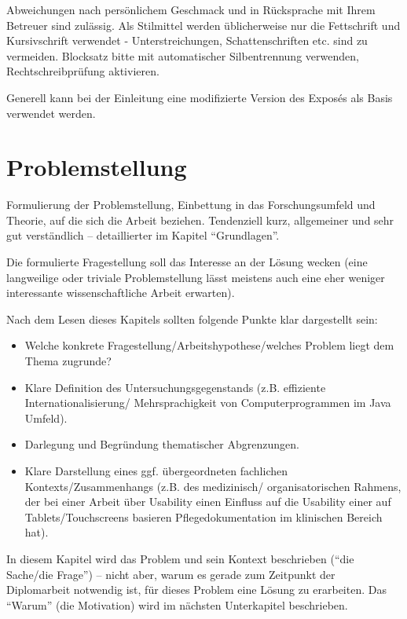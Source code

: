 Abweichungen nach persönlichem Geschmack und in Rücksprache mit Ihrem Betreuer sind zulässig. Als Stilmittel werden üblicherweise nur die Fettschrift und Kursivschrift verwendet - Unterstreichungen, Schattenschriften etc. sind zu vermeiden. Blocksatz bitte mit automatischer Silbentrennung verwenden, Rechtschreibprüfung aktivieren.

Generell kann bei der Einleitung eine modifizierte Version des Exposés als Basis verwendet werden.

\section{Problemstellung}

Formulierung der Problemstellung, Einbettung in das Forschungsumfeld und Theorie, auf die sich die Arbeit beziehen. Tendenziell kurz, allgemeiner und sehr gut verständlich -- detaillierter im Kapitel \enquote{Grundlagen}.

Die formulierte Fragestellung soll das Interesse an der Lösung wecken (eine langweilige oder triviale Problemstellung lässt meistens auch eine eher weniger interessante wissenschaftliche Arbeit erwarten).

\makeatletter\ifthesis@masterthesis
Nach dem Lesen dieses Kapitels sollten folgende Punkte klar dargestellt sein:
\begin{itemize}
	\item Welche konkrete Fragestellung/Arbeitshypothese/welches Problem liegt dem Thema zugrunde?
	\item Klare Definition des Untersuchungsgegenstands (z.B. effiziente Internationalisierung/ Mehrsprachigkeit von Computerprogrammen im Java Umfeld).
	\item Darlegung und Begründung thematischer Abgrenzungen.
	\item Klare Darstellung eines ggf. übergeordneten fachlichen Kontexts/Zusammenhangs (z.B. des medizinisch/ organisatorischen Rahmens, der bei einer Arbeit über Usability einen Einfluss auf die Usability einer auf Tablets/Touchscreens basieren Pflegedokumentation im klinischen Bereich hat).
\end{itemize}

In diesem Kapitel wird das Problem und sein Kontext beschrieben (\enquote{die Sache/die Frage}) – nicht aber, warum es gerade zum Zeitpunkt der Diplomarbeit notwendig ist, für dieses Problem eine Lösung zu erarbeiten. Das \enquote{Warum} (die Motivation) wird im nächsten Unterkapitel beschrieben.
\fi\makeatother


